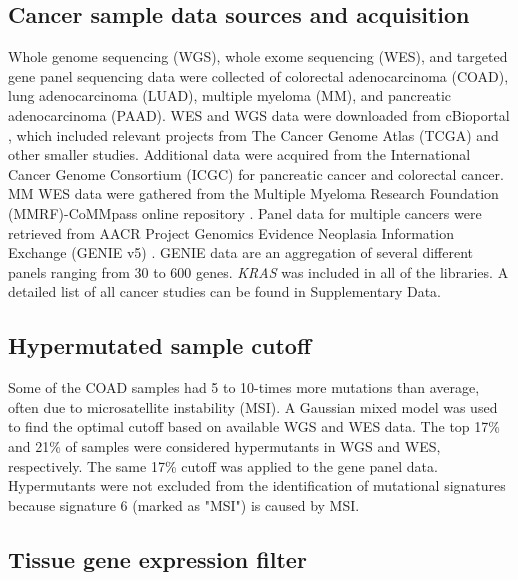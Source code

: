 \documentclass[english, 10pt, letterpaper]{article}
\newcommand{\KRAS}{\emph{KRAS}}
\begin{document}
\subsection*{Cancer sample data sources and acquisition}

Whole genome sequencing (WGS), whole exome sequencing (WES), and targeted gene panel sequencing data were collected of colorectal adenocarcinoma (COAD), lung adenocarcinoma (LUAD), multiple myeloma (MM), and pancreatic adenocarcinoma (PAAD).
WES and WGS data were downloaded from cBioportal \cite{Gao2013, Cerami2012}, which included relevant projects from The Cancer Genome Atlas (TCGA) \cite{CancerGenomeAtlasNetwork2012, CancerGenomeAtlasResearchNetwork2014, CancerGenomeAtlasResearchNetwork.Electronicaddress:andrew_aguirredfci.harvard.edu2017} and other smaller studies. 
Additional data were acquired from the International Cancer Genome Consortium (ICGC) for pancreatic cancer \cite{Scarlett2011} and colorectal cancer. 
MM WES data were gathered from the Multiple Myeloma Research Foundation (MMRF)-CoMMpass online repository \cite{Walker2019AAnalysis.}.
Panel data for multiple cancers were retrieved from AACR Project Genomics Evidence Neoplasia Information Exchange (GENIE v5) \cite{AACRProjectGENIEConsortium2017AACRConsortium.}.
GENIE data are an aggregation of several different panels ranging from 30 to 600 genes.
\KRAS{} was included in all of the libraries. 
A detailed list of all cancer studies can be found in Supplementary Data.


\subsection*{Hypermutated sample cutoff}

Some of the COAD samples had 5 to 10-times more mutations than average, often due to microsatellite instability (MSI). 
A Gaussian mixed model was used to find the optimal cutoff based on available WGS and WES data. 
The top 17\% and 21\% of samples were considered hypermutants in WGS and WES, respectively.
The same 17\% cutoff was applied to the gene panel data. 
Hypermutants were not excluded from the identification of mutational signatures because signature 6 (marked as "MSI") is caused by MSI.


\subsection*{Tissue gene expression filter}
\end{document}
